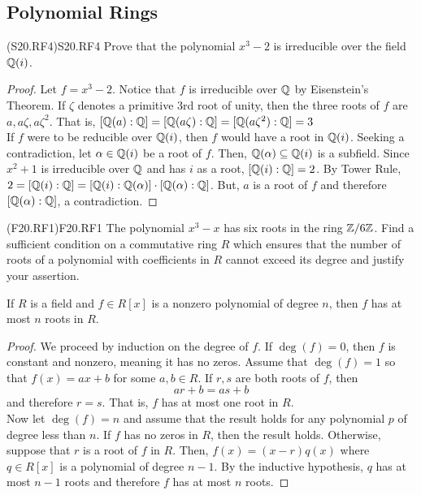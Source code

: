 \documentclass[../AlgebraQualSolutions.tex]{subfiles}
\begin{document}
\subsection{Polynomial Rings}

\begin{prob}{(S20.RF4)}{S20.RF4}
    Prove that the polynomial $x^3 - 2$ is irreducible over the field $\mathbb{Q}(i)$.
\end{prob}

\begin{proof}
    Let $f = x^3 - 2$. Notice that $f$ is irreducible over $\mathbb{Q}$ by Eisenstein's Theorem. If $\zeta$ denotes a primitive 3rd root of unity, then the three roots of $f$ are $a,a\zeta, a\zeta^2$. That is, $[\mathbb{Q}(a): \mathbb{Q}] = [\mathbb{Q}(a\zeta): \mathbb{Q}] = [\mathbb{Q}(a\zeta^2): \mathbb{Q}] = 3$\\
    
    If $f$ were to be reducible over $\mathbb{Q}(i)$, then $f$ would have a root in $\mathbb{Q}(i)$. Seeking a contradiction, let $\alpha \in \mathbb{Q}(i)$ be a root of $f$. Then, $\mathbb{Q}(\alpha) \subseteq \mathbb{Q}(i)$ is a subfield. Since $x^2 + 1$ is irreducible over $\mathbb{Q}$ and has $i$ as a root, $[\mathbb{Q}(i): \mathbb{Q}] = 2$. By Tower Rule, $2 = [\mathbb{Q}(i): \mathbb{Q}] = [\mathbb{Q}(i): \mathbb{Q}(\alpha)]\cdot[\mathbb{Q}(\alpha): \mathbb{Q}]$. But, $a$ is a root of $f$ and therefore $[\mathbb{Q}(\alpha): \mathbb{Q}]$, a contradiction.
\end{proof}

\begin{prob}{(F20.RF1)}{F20.RF1}
    The polynomial $x^3 - x$ has six roots in the ring $\mathbb{Z}/6\mathbb{Z}$. Find a sufficient condition on a commutative ring $R$ which ensures that the number of roots of a polynomial with coefficients in $R$ cannot exceed its degree and justify your assertion.
    \end{prob}
    
    \begin{claim}
        If $R$ is a field and $f \in R[x]$ is a nonzero polynomial of degree $n$, then $f$ has at most $n$ roots in $R$.
    
        \begin{proof}
            We proceed by induction on the degree of $f$. If $\deg(f) = 0$, then $f$ is constant and nonzero, meaning it has no zeros. Assume that $\deg(f) = 1$ so that $f(x) = ax + b$ for some $a,b \in R$. If $r,s$ are both roots of $f$, then
                \[ar + b = as + b\]
            and therefore $r = s$. That is, $f$ has at most one root in $R$.\\
            
            Now let $\deg(f) = n$ and assume that the result holds for any polynomial $p$ of degree less than $n$. If $f$ has no zeros in $R$, then the result holds. Otherwise, suppose that $r$ is a root of $f$ in $R$. Then, $f(x) = (x - r)q(x)$ where $q \in R[x]$ is a polynomial of degree $n - 1$. By the inductive hypothesis, $q$ has at most $n - 1$ roots and therefore $f$ has at most $n$ roots.
        \end{proof}
    \end{claim}
\end{document}
